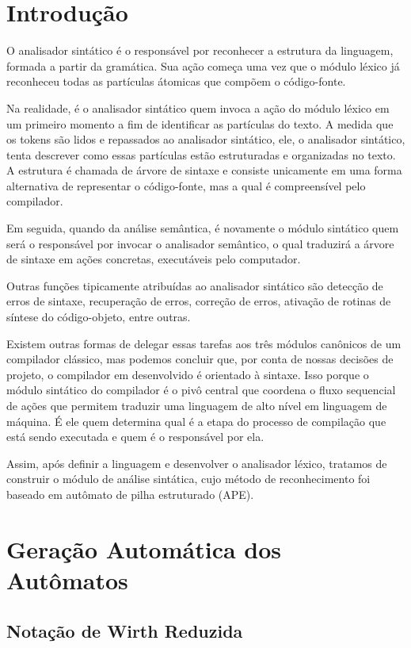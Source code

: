 
\section{Introdução}

  O analisador sintático é o responsável por reconhecer a estrutura da linguagem, formada a partir da gramática. Sua ação começa uma vez que o módulo léxico já reconheceu todas as partículas átomicas que compõem o código-fonte.


  Na realidade, é o analisador sintático quem invoca a ação do módulo léxico em um primeiro momento a fim de identificar as partículas do texto. A medida que os tokens são lidos e repassados ao analisador sintático, ele, o analisador sintático, tenta descrever como essas partículas estão estruturadas e organizadas no texto. A estrutura é chamada de árvore de sintaxe e consiste unicamente em uma forma alternativa de representar o código-fonte, mas a qual é compreensível pelo compilador.


  Em seguida, quando da análise semântica, é novamente o módulo sintático quem será o responsável por invocar o analisador semântico, o qual traduzirá a árvore de sintaxe em ações concretas, executáveis pelo computador.

        
  Outras funções tipicamente atribuídas ao analisador sintático são detecção de erros de sintaxe, recuperação de erros, correção de erros, ativação de rotinas de síntese do código-objeto, entre outras.


  Existem outras formas de delegar essas tarefas aos três módulos canônicos de um compilador clássico, mas podemos concluir que, por conta de nossas decisões de projeto, o compilador em desenvolvido é orientado à sintaxe. Isso porque o módulo sintático do compilador é o pivô central que coordena o fluxo sequencial de ações que permitem traduzir uma linguagem de alto nível em linguagem de máquina. É ele quem determina qual é a etapa do processo de compilação que está sendo executada e quem é o responsável por ela.

        
  Assim, após definir a linguagem e desenvolver o analisador léxico, tratamos de construir o módulo de análise sintática, cujo método de reconhecimento foi baseado em autômato de pilha estruturado (APE). 

\section{Geração Automática dos Autômatos}
  \subsection{Notação de Wirth Reduzida}

